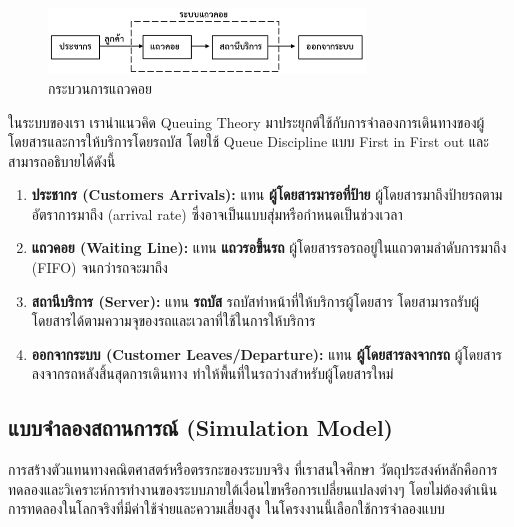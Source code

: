 \begin{figure}[h]
    \centering
    \includegraphics[width=0.75\textwidth]{Query_theory.png}
    \caption{กระบวนการแถวคอย}
    \label{fig:example}
\end{figure}
\indent ในระบบของเรา เรานำแนวคิด Queuing Theory มาประยุกต์ใช้กับการจำลองการเดินทางของผู้โดยสารและการให้บริการโดยรถบัส โดยใช้ Queue Discipline แบบ First in First out และสามารถอธิบายได้ดังนี้
\begin{enumerate}
    \item \textbf{ประชากร (Customers Arrivals):} แทน \textbf{ผู้โดยสารมารอที่ป้าย} ผู้โดยสารมาถึงป้ายรถตามอัตราการมาถึง (arrival rate) ซึ่งอาจเป็นแบบสุ่มหรือกำหนดเป็นช่วงเวลา
    \item \textbf{แถวคอย (Waiting Line):} แทน \textbf{แถวรอขึ้นรถ} ผู้โดยสารรอรถอยู่ในแถวตามลำดับการมาถึง (FIFO) จนกว่ารถจะมาถึง
    \item \textbf{สถานีบริการ (Server):} แทน \textbf{รถบัส} รถบัสทำหน้าที่ให้บริการผู้โดยสาร โดยสามารถรับผู้โดยสารได้ตามความจุของรถและเวลาที่ใช้ในการให้บริการ
    \item \textbf{ออกจากระบบ (Customer Leaves/Departure):} แทน \textbf{ผู้โดยสารลงจากรถ}  ผู้โดยสารลงจากรถหลังสิ้นสุดการเดินทาง ทำให้พื้นที่ในรถว่างสำหรับผู้โดยสารใหม่
\end{enumerate}

\subsection{แบบจำลองสถานการณ์ (Simulation Model)}
\begin{mypara}
    \indent การสร้างตัวแทนทางคณิตศาสตร์หรือตรรกะของระบบจริง ที่เราสนใจศึกษา 
    วัตถุประสงค์หลักคือการทดลองและวิเคราะห์การทำงานของระบบภายใต้เงื่อนไขหรือการเปลี่ยนแปลงต่างๆ 
    โดยไม่ต้องดำเนินการทดลองในโลกจริงที่มีค่าใช้จ่ายและความเสี่ยงสูง ในโครงงานนี้เลือกใช้การจำลองแบบ
\end{mypara}
